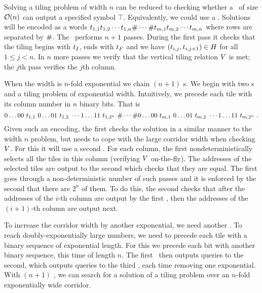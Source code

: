 Solving a tiling problem of width $n$ can be reduced to checking whether a \FFT\ of size 
${\mathcal{O}}\mathord{\left( n \right)}$ 
can output a specified symbol $\top$.
Equivalently, we could use a \FFA.
Solutions will be encoded as a words
$t_{1,1} t_{1,2} \cdots t_{1,n} \# \cdots \# t_{m,1} t_{m,2} \cdots t_{m,n}$
where rows are separated by $\#$.
The \FFT\ performs $n+1$ passes.
During the first pass it checks that the tiling begins with $t_I$, ends with $t_F$ and we have 
$\left( t_{i,j}, t_{i,j+1} \right) \in H$
for all
$1 \leq j < n$.
In $n$ more passes we verify that the vertical tiling relation $V$ is met; the $j$th pass verifies the $j$th column.

When the width is $n$-fold exponential we chain $(n+1)$ \FFT{}s.
We begin with two \FFT{}s and a tiling problem of exponential width.
Intuitively, we precede each tile with its column number in $n$ binary bits.
That is
\[
    0\ldots00\ \tile_{1,1}\ %
    0\ldots01\ \tile_{1,2}\ %
    \cdots
    1\ldots11\ \tile_{1,2^n}\ %
    \numsep
    \cdots
    \numsep
    0\ldots00\ \tile_{m,1}\ %
    0\ldots01\ \tile_{m,2}\ %
    \cdots
    1\ldots11\ \tile_{m,2^n} \ .
\]
Given such an encoding, the first \FFT{} checks the solution in a similar manner to the width $n$ problem, but needs to cope with the large corridor width when checking $V$.
For this it will use a second \FFT.
For each column, the first \FFT{} nondeterministically selects all the tiles in this column 
(verifying $V$ on-the-fly).
The addresses of the selected tiles are output to the second \FFT{} which checks that they are equal.
The first \FFT{} goes through a non-deterministic number of such passes and it is enforced by the second \FFT{} that there are $2^n$ of them.
To do this, the second \FFT{} checks that after the addresses of the $i$-th column are output by the first \FFT{}, then the addresses of the $(i+1)$-th column are output next.

To increase the corridor width by another exponential, we need another \FFT.
To reach doubly-exponentially large numbers, we need to precede each tile with a binary sequence of exponential length.
For this we precede each bit with another binary sequence, this time of length $n$.
The first \FFT\ then outputs queries to the second, which outputs queries to the third \FFT, each time removing one exponential.
With $(n+1)$ \FFT, we can search for a solution of a tiling problem over an $n$-fold exponentially wide corridor.



